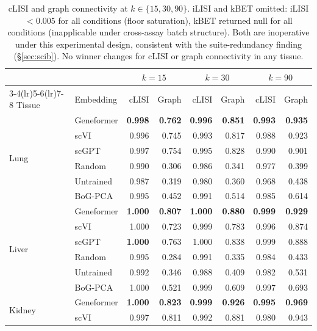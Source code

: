 \documentclass[9pt,lineno]{elife}
\begin{document}
\begin{table}[h!]
\centering
\caption{cLISI and graph connectivity at $k \in \{15, 30, 90\}$. iLISI and kBET omitted: iLISI $< 0.005$ for all conditions (floor saturation), kBET returned null for all conditions (inapplicable under cross-assay batch structure). Both are inoperative under this experimental design, consistent with the suite-redundancy finding (\S\ref{sec:scib}). No winner changes for cLISI or graph connectivity in any tissue.}
\label{tab:app_knn}
\scriptsize
\begin{tabular}{@{}ll rr rr rr@{}}
\toprule
 & & \multicolumn{2}{c}{$k = 15$} & \multicolumn{2}{c}{$k = 30$} & \multicolumn{2}{c}{$k = 90$} \\
\cmidrule(lr){3-4}\cmidrule(lr){5-6}\cmidrule(lr){7-8}
Tissue & Embedding & cLISI & Graph & cLISI & Graph & cLISI & Graph \\
\midrule
\multirow{6}{*}{Lung}
 & Geneformer & \textbf{0.998} & \textbf{0.762} & \textbf{0.996} & \textbf{0.851} & \textbf{0.993} & \textbf{0.935} \\
 & scVI       & 0.996 & 0.745 & 0.993 & 0.817 & 0.988 & 0.923 \\
 & scGPT      & 0.997 & 0.754 & 0.995 & 0.828 & 0.990 & 0.901 \\
 & Random     & 0.990 & 0.306 & 0.986 & 0.341 & 0.977 & 0.399 \\
 & Untrained  & 0.987 & 0.319 & 0.980 & 0.360 & 0.968 & 0.438 \\
 & BoG-PCA    & 0.995 & 0.452 & 0.991 & 0.514 & 0.985 & 0.614 \\
\midrule
\multirow{6}{*}{Liver}
 & Geneformer & \textbf{1.000} & \textbf{0.807} & \textbf{1.000} & \textbf{0.880} & \textbf{0.999} & \textbf{0.929} \\
 & scVI       & 1.000 & 0.723 & 0.999 & 0.783 & 0.996 & 0.874 \\
 & scGPT      & \textbf{1.000} & 0.763 & 1.000 & 0.838 & 0.999 & 0.888 \\
 & Random     & 0.995 & 0.284 & 0.991 & 0.335 & 0.984 & 0.433 \\
 & Untrained  & 0.992 & 0.346 & 0.988 & 0.409 & 0.982 & 0.531 \\
 & BoG-PCA    & 1.000 & 0.521 & 0.999 & 0.609 & 0.997 & 0.693 \\
\midrule
\multirow{6}{*}{Kidney}
 & Geneformer & \textbf{1.000} & \textbf{0.823} & \textbf{0.999} & \textbf{0.926} & \textbf{0.995} & \textbf{0.969} \\
 & scVI       & 0.997 & 0.811 & 0.992 & 0.881 & 0.980 & 0.943 \\

\end{tabular}
\end{table}
\end{document}
